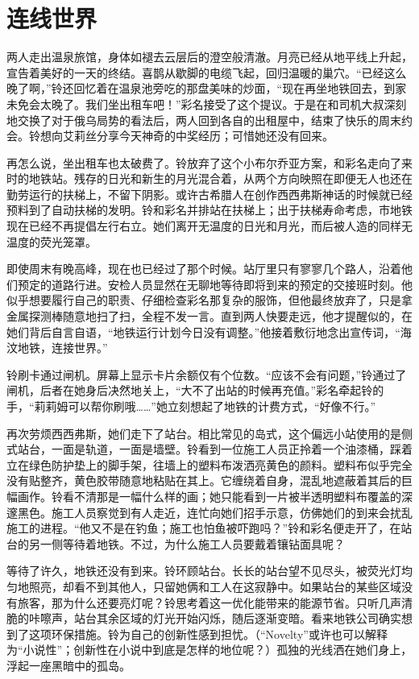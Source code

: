 \chapter{连线世界}

\begin{branch}
\gutend 两人走出温泉旅馆，身体如褪去云层后的澄空般清澈。月亮已经从地平线上升起，宣告着美好的一天的终结。喜鹊从歇脚的电缆飞起，回归温暖的巢穴。“已经这么晚了啊，”铃还回忆着在温泉池旁吃的那盘美味的炒面，“现在再坐地铁回去，到家未免会太晚了。我们坐出租车吧！”彩名接受了这个提议。于是在和司机大叔深刻地交换了对于俄乌局势的看法后，两人回到各自的出租屋中，结束了快乐的周末约会。铃想向艾莉丝分享今天神奇的中奖经历；可惜她还没有回来。
\end{branch}

再怎么说，坐出租车也太破费了。铃放弃了这个小布尔乔亚方案，和彩名走向了来时的地铁站。残存的日光和新生的月光混合着，从两个方向映照在即便无人也还在勤劳运行的扶梯上，不留下阴影。或许古希腊人在创作西西弗斯神话的时候就已经预料到了自动扶梯的发明。铃和彩名并排站在扶梯上；出于扶梯寿命考虑，市地铁现在已经不再提倡左行右立。她们离开无温度的日光和月光，而后被人造的同样无温度的荧光笼罩。

即使周末有晚高峰，现在也已经过了那个时候。站厅里只有寥寥几个路人，沿着他们预定的道路行进。安检人员显然在无聊地等待即将到来的预定的交接班时刻。他似乎想要履行自己的职责、仔细检查彩名那复杂的服饰，但他最终放弃了，只是拿金属探测棒随意地扫了扫，全程不发一言。直到两人快要走远，他才提醒似的，在她们背后自言自语，“地铁运行计划今日没有调整。”他接着敷衍地念出宣传词，“海汶地铁，连接世界。”

铃刷卡通过闸机。屏幕上显示卡片余额仅有个位数。“应该不会有问题，”铃通过了闸机，后者在她身后决然地关上，“大不了出站的时候再充值。”彩名牵起铃的手，“莉莉姆可以帮你刷哦……”她立刻想起了地铁的计费方式，“好像不行。”

再次劳烦西西弗斯，她们走下了站台。相比常见的岛式，这个偏远小站使用的是侧式站台，一面是轨道，一面是墙壁。铃看到一位施工人员正拎着一个油漆桶，踩着立在绿色防护垫上的脚手架，往墙上的塑料布泼洒亮黄色的颜料。塑料布似乎完全没有贴整齐，黄色胶带随意地粘贴在其上。它缠绕着自身，混乱地遮蔽着其后的巨幅画作。铃看不清那是一幅什么样的画；她只能看到一片被半透明塑料布覆盖的深邃黑色。施工人员察觉到有人走近，连忙向她们招手示意，仿佛她们的到来会扰乱施工的进程。“他又不是在钓鱼；施工也怕鱼被吓跑吗？”铃和彩名便走开了，在站台的另一侧等待着地铁。不过，为什么施工人员要戴着镶钻面具呢？

等待了许久，地铁还没有到来。铃环顾站台。长长的站台望不见尽头，被荧光灯均匀地照亮，却看不到其他人，只留她俩和工人在这寂静中。如果站台的某些区域没有旅客，那为什么还要亮灯呢？铃思考着这一优化能带来的能源节省。只听几声清脆的咔嚓声，站台其余区域的灯光开始闪烁，随后逐渐变暗。看来地铁公司确实想到了这项环保措施。铃为自己的创新性感到担忧。（“Novelty”或许也可以解释为“小说性”；创新性在小说中到底是怎样的地位呢？）孤独的光线洒在她们身上，浮起一座黑暗中的孤岛。

